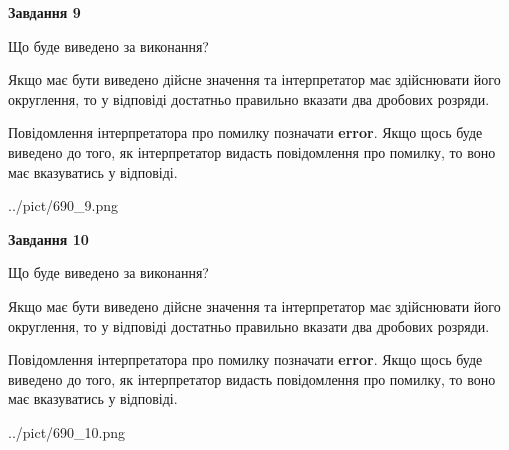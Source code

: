 \documentclass[12pt, ukrainian]{article}
\begin{document}
{\begin {Large}
{\begin {center}\textbf{Завдання 9}\end {center}}\par
Що буде виведено за виконання? \par

Якщо має бути виведено дійсне значення та інтерпретатор має здійснювати його округлення, 
то у відповіді достатньо правильно вказати два дробових розряди.

Повідомлення інтерпретатора про помилку позначати \textbf{error}.
Якщо щось буде виведено до того, як інтерпретатор видасть повідомлення про помилку, 
то воно має вказуватись у відповіді. \par

\begin{center}
	{../pict/690_9.png}
\end{center}
\newpage

{\begin {center}\textbf{Завдання 10}\end {center}}\par
Що буде виведено за виконання? \par

Якщо має бути виведено дійсне значення та інтерпретатор має здійснювати його округлення, 
то у відповіді достатньо правильно вказати два дробових розряди.

Повідомлення інтерпретатора про помилку позначати \textbf{error}.
Якщо щось буде виведено до того, як інтерпретатор видасть повідомлення про помилку, 
то воно має вказуватись у відповіді. \par

\begin{center}
	{../pict/690_10.png}
\end{center}
\newpage

\end {Large}}
\end{document}
